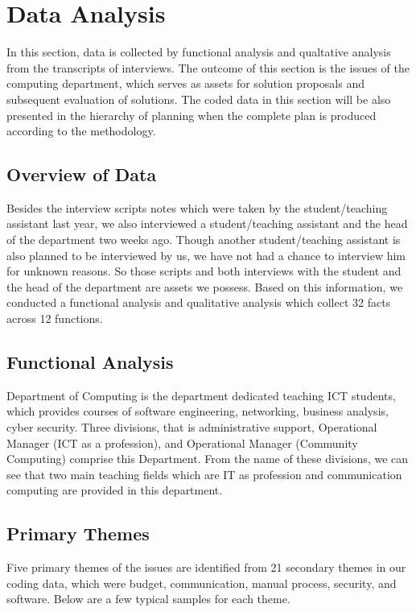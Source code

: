 
\section{Data Analysis}

In this section, data is collected by functional analysis and qualtative analysis from the transcripts of interviews. The outcome of this section is the issues of the computing department, which serves as assets for solution proposals and subsequent evaluation of solutions. The coded data in this section will be also presented in the hierarchy of planning when the complete plan is produced according to the methodology.

\subsection{Overview of Data}

Besides the interview scripts notes which were taken by the student/teaching assistant last year, we also interviewed a student/teaching assistant and the head of the department two weeks ago. Though another student/teaching assistant is also planned to be interviewed by us, we have not had a chance to interview him for unknown reasons. So those scripts and both interviews with the student and the head of the department are assets we possess. Based on this information, we conducted a functional analysis and qualitative analysis which collect 32 facts across 12 functions.

\subsection{Functional Analysis}

Department of Computing is the department dedicated teaching ICT students, which provides courses of software engineering, networking, business analysis, cyber security. Three divisions, that is administrative support, Operational Manager (ICT as a profession), and Operational Manager (Community Computing) comprise this Department. From the name of these divisions, we can see that two main teaching fields which are IT as profession and communication computing are provided in this department.

\subsection{Primary Themes}
Five primary themes of the issues are identified from 21 secondary themes in our coding data, which were budget, communication, manual process, security, and software. Below are a few typical samples for each theme.

